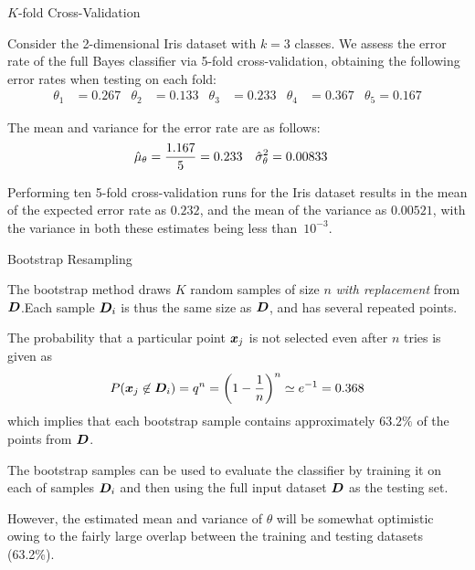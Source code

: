 \begin{frame}[fragile]{$K$-fold Cross-Validation}

Consider the 2-dimensional Iris dataset 
with $k=3$ classes. We assess
the error rate of the full Bayes classif\/{i}er via 5-fold
cross-validation, obtaining the following error rates when testing
on each fold:
\begin{align*}
  \theta_1 & = 0.267 & \theta_2 & = 0.133 &
  \theta_3 & = 0.233 & \theta_4 & = 0.367 & \theta_5 = 0.167
\end{align*}

The mean and variance for the error
rate are as follows:
\begin{align*}
  \hat{\mu}_\theta &= {1.167\over 5} = 0.233 & \hat{\sigma}^2_\theta & = 0.00833
\end{align*}

Performing ten
5-fold cross-validation runs for the Iris dataset results in the mean of the
expected error rate as $0.232$, and the mean of the variance as
$0.00521$, with the variance in both these estimates being
less than~$10^{-3}$.

\end{frame}



\begin{frame}{Bootstrap Resampling}

The bootstrap method draws $K$ random samples
of size $n$ {\em with replacement} from ${\boldsymbol D}$.Each sample ${\boldsymbol D}_i$
is thus the same size as ${\boldsymbol D}$, and has several repeated points.

\medskip
The probability that a particular point ${\boldsymbol x}_{j}$ is
not selected even after $n$ tries is given as
\begin{align*}
  P({\boldsymbol x}_{j} \not\in {\boldsymbol D}_i) = q^n  = \left( 1- {1\over n}\right)^n \simeq
  e^{-1} = 0.368
\end{align*}
which implies 
that each bootstrap sample contains approximately $63.2\%$ of the
points from ${\boldsymbol D}$.

\medskip
The bootstrap samples can be used to evaluate the classif\/{i}er by
training it on each of samples ${\boldsymbol D}_i$ and then using the full
input dataset ${\boldsymbol D}$ as the testing set.

\medskip
However, the estimated mean and variance of $\theta$ will be
somewhat optimistic owing to the fairly large overlap between the
training and testing datasets (63.2\%). 
\end{frame}




